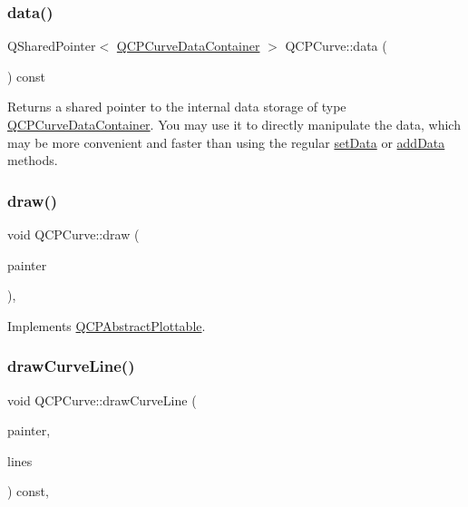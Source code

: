 \subsubsection{\texorpdfstring{data()}{data()}}
{\footnotesize\ttfamily Q\+Shared\+Pointer$<$ \mbox{\hyperlink{qcustomplot_8h_aaeee80d5664ea91beb9d7968790d0e65}{Q\+C\+P\+Curve\+Data\+Container}} $>$ Q\+C\+P\+Curve\+::data (\begin{DoxyParamCaption}{ }\end{DoxyParamCaption}) const\hspace{0.3cm}{\ttfamily [inline]}}

Returns a shared pointer to the internal data storage of type \mbox{\hyperlink{qcustomplot_8h_aaeee80d5664ea91beb9d7968790d0e65}{Q\+C\+P\+Curve\+Data\+Container}}. You may use it to directly manipulate the data, which may be more convenient and faster than using the regular \mbox{\hyperlink{class_q_c_p_curve_a41246850d2e080bc57183ca19cd4135e}{set\+Data}} or \mbox{\hyperlink{class_q_c_p_curve_a73edf394b94f3f24f07518e30565a07f}{add\+Data}} methods. \mbox{\label{class_q_c_p_curve_ac199d41d23865cd68bd7b598308a4433}} 
\subsubsection{\texorpdfstring{draw()}{draw()}}
{\footnotesize\ttfamily void Q\+C\+P\+Curve\+::draw (\begin{DoxyParamCaption}\item[{\mbox{\hyperlink{class_q_c_p_painter}{Q\+C\+P\+Painter}} $\ast$}]{painter }\end{DoxyParamCaption})\hspace{0.3cm}{\ttfamily [protected]}, {\ttfamily [virtual]}}



Implements \mbox{\hyperlink{class_q_c_p_abstract_plottable_a453f676a5cee7bf846c5f0fa05ea84b3}{Q\+C\+P\+Abstract\+Plottable}}.

\mbox{\label{class_q_c_p_curve_aa4d7415f7c69eb7820263941f7d88e2c}} 
\subsubsection{\texorpdfstring{drawCurveLine()}{drawCurveLine()}}
{\footnotesize\ttfamily void Q\+C\+P\+Curve\+::draw\+Curve\+Line (\begin{DoxyParamCaption}\item[{\mbox{\hyperlink{class_q_c_p_painter}{Q\+C\+P\+Painter}} $\ast$}]{painter,  }\item[{const Q\+Vector$<$ Q\+PointF $>$ \&}]{lines }\end{DoxyParamCaption}) const\hspace{0.3cm}{\ttfamily [protected]}, {\ttfamily [virtual]}}

